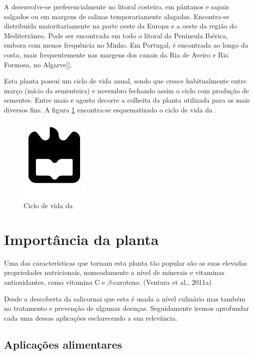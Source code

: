 A \sr desenvolve-se preferencialmente no litoral costeiro, em pântanos e sapais salgados ou em margens de salinas temporariamente alagadas. Encontra-se distribuída maioritariamente na parte oeste da Europa e a oeste da região do Mediterrâneo. Pode ser encontrada em todo o litoral da Península Ibérica, embora com menos frequência no Minho\cite{Silva2000}. Em Portugal, é encontrada ao longo da costa, mais frequentemente nas margens dos canais da Ria de Aveiro e Ria Formosa, no Algarve[]. 

Esta planta possui um ciclo de vida anual, sendo que cresce habitualmente entre março (início da sementeira) e novembro fechando assim o ciclo com produção de sementes. Entre maio  e agosto decorre a colheita da planta\cite{RaquelPinto} utilizada para os mais diversos fins. A figura \ref{ciclodevida} encontra-se esquematizado o ciclo de vida da \sr. 

 \begin{figure}[!htb]
 	\centering
 	\includegraphics{uaLogoNew.pdf}
 	\caption{Ciclo de vida da \sr}
 	\label{ciclodevida}
 \end{figure}
 
 



\section{Importância da planta}


Uma das características que tornam esta planta tão popular são as suas elevadas propriedades nutricionais, nomeadamente a nível de minerais e vitaminas antioxidantes, como vitamina C e $\beta$-caroteno. (Ventura et al., 2011a)

Desde a descoberta da salicornai que esta é usada a nível culinário mas também no tratamento e prevenção de algumas doenças. Seguidamente iremos aprofundar cada uma dessas aplicações esclarecendo a sua relevância. 



\subsection{Aplicações alimentares}


